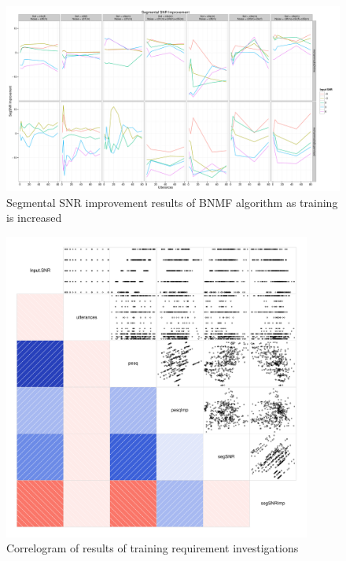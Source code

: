 \begin{figure}[p]
\noindent \begin{centering}
\includegraphics[angle=90,width=1\textwidth,height=0.95\textheight]{fig/R/train/segSNRImp}
\par\end{centering}

\protect\caption{\label{fig:vary-train-segsnr-imp}Segmental \acs{SNR} improvement
results of \acs{BNMF} algorithm as training is increased}
\end{figure}


\begin{figure}[h]


\noindent \begin{centering}
\includegraphics[width=0.9\textwidth]{fig/R/train/corr}
\par\end{centering}

\protect\caption{\label{fig:train-req-corr}Correlogram of results of training requirement
investigations}
\end{figure}


